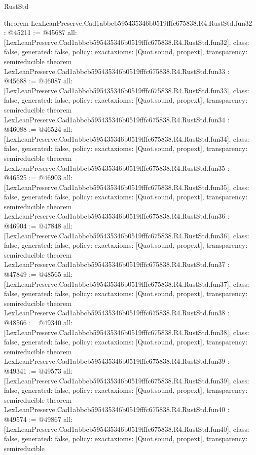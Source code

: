 \begin{lexlean}{RustStd}
\begin{coremodule}
{}
theorem LexLeanPreserve.Cad1abbcb595435346b0519fffc675838.R4.RustStd.fun32 : @45211 := @45687 {
  all: [LexLeanPreserve.Cad1abbcb595435346b0519fffc675838.R4.RustStd.fun32],
  class: false,
  generated: false,
  policy: exact{axioms: [Quot.sound, propext]},
  transparency: semireducible
}
theorem LexLeanPreserve.Cad1abbcb595435346b0519fffc675838.R4.RustStd.fun33 : @45688 := @46087 {
  all: [LexLeanPreserve.Cad1abbcb595435346b0519fffc675838.R4.RustStd.fun33],
  class: false,
  generated: false,
  policy: exact{axioms: [Quot.sound, propext]},
  transparency: semireducible
}
theorem LexLeanPreserve.Cad1abbcb595435346b0519fffc675838.R4.RustStd.fun34 : @46088 := @46524 {
  all: [LexLeanPreserve.Cad1abbcb595435346b0519fffc675838.R4.RustStd.fun34],
  class: false,
  generated: false,
  policy: exact{axioms: [Quot.sound, propext]},
  transparency: semireducible
}
theorem LexLeanPreserve.Cad1abbcb595435346b0519fffc675838.R4.RustStd.fun35 : @46525 := @46903 {
  all: [LexLeanPreserve.Cad1abbcb595435346b0519fffc675838.R4.RustStd.fun35],
  class: false,
  generated: false,
  policy: exact{axioms: [Quot.sound, propext]},
  transparency: semireducible
}
theorem LexLeanPreserve.Cad1abbcb595435346b0519fffc675838.R4.RustStd.fun36 : @46904 := @47848 {
  all: [LexLeanPreserve.Cad1abbcb595435346b0519fffc675838.R4.RustStd.fun36],
  class: false,
  generated: false,
  policy: exact{axioms: [Quot.sound, propext]},
  transparency: semireducible
}
theorem LexLeanPreserve.Cad1abbcb595435346b0519fffc675838.R4.RustStd.fun37 : @47849 := @48565 {
  all: [LexLeanPreserve.Cad1abbcb595435346b0519fffc675838.R4.RustStd.fun37],
  class: false,
  generated: false,
  policy: exact{axioms: [Quot.sound, propext]},
  transparency: semireducible
}
theorem LexLeanPreserve.Cad1abbcb595435346b0519fffc675838.R4.RustStd.fun38 : @48566 := @49340 {
  all: [LexLeanPreserve.Cad1abbcb595435346b0519fffc675838.R4.RustStd.fun38],
  class: false,
  generated: false,
  policy: exact{axioms: [Quot.sound, propext]},
  transparency: semireducible
}
theorem LexLeanPreserve.Cad1abbcb595435346b0519fffc675838.R4.RustStd.fun39 : @49341 := @49573 {
  all: [LexLeanPreserve.Cad1abbcb595435346b0519fffc675838.R4.RustStd.fun39],
  class: false,
  generated: false,
  policy: exact{axioms: [Quot.sound, propext]},
  transparency: semireducible
}
theorem LexLeanPreserve.Cad1abbcb595435346b0519fffc675838.R4.RustStd.fun40 : @49574 := @49867 {
  all: [LexLeanPreserve.Cad1abbcb595435346b0519fffc675838.R4.RustStd.fun40],
  class: false,
  generated: false,
  policy: exact{axioms: [Quot.sound, propext]},
  transparency: semireducible
}
\end{coremodule}
\end{lexlean}
